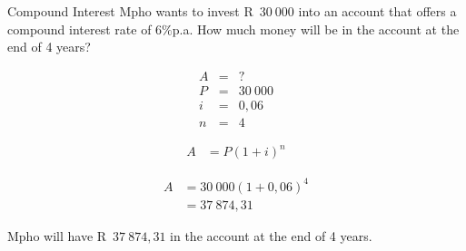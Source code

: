 

\begin{wex}{Compound Interest}{
    Mpho wants to invest R~$30~000$ into an account that offers a compound interest rate of $6\%$p.a. How much money will be in the account at the end of 4 years?}{
    
    \begin{eqnarray*}
	A &=& ?\\
	P &=& 30~000\\
	i &=& 0,06\\
	n &=& 4
    \end{eqnarray*}

    \begin{align*}
	A &= P(1 + i)^n
    \end{align*}

    \begin{align*}
	A &= 30~000(1 + 0,06)^4\\
	  &= 37~874,31
    \end{align*}

    Mpho will have R~$37~874,31$ in the account at the end of 4 years.
    }
\end{wex}


